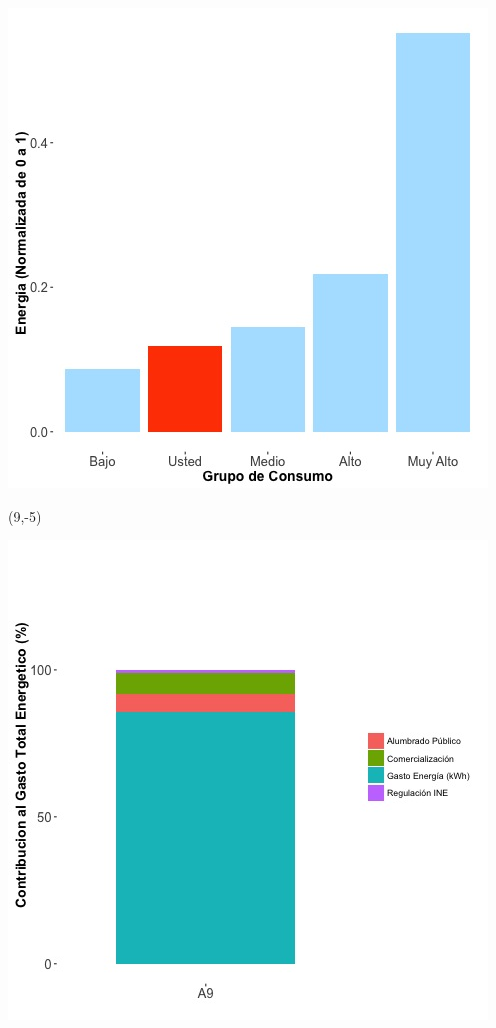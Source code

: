 \documentclass{article}\usepackage[]{graphicx}\usepackage[]{color}
\newenvironment{knitrout}{}{} %
\begin{document}
\begin{knitrout}
\color{fgcolor}
\includegraphics[scale=0.65]{figure/A9_neighbor_plot} 
\end{knitrout}

 \begin{textblock}{1}(9,-5)
\begin{minipage}{20em}
\begingroup

\endgroup
\end{minipage}
\end{textblock}

\begin{knitrout}
\color{fgcolor}
\includegraphics[scale=0.65]{figure/A9_costvars_plot.jpg} 
\end{knitrout}
\end{document}
